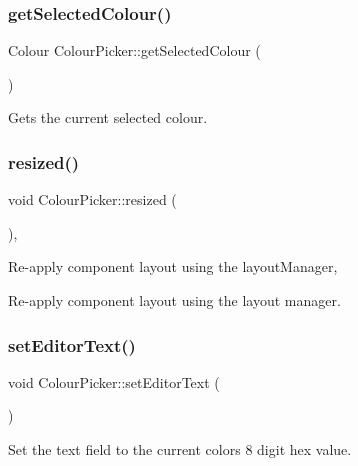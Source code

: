 \subsubsection{\texorpdfstring{get\+Selected\+Colour()}{getSelectedColour()}}
{\footnotesize\ttfamily Colour Colour\+Picker\+::get\+Selected\+Colour (\begin{DoxyParamCaption}{ }\end{DoxyParamCaption})}

Gets the current selected colour. \mbox{\label{classColourPicker_a9572f9b8ec233f5e89d1b6893c9b4300}} 
\subsubsection{\texorpdfstring{resized()}{resized()}}
{\footnotesize\ttfamily void Colour\+Picker\+::resized (\begin{DoxyParamCaption}{ }\end{DoxyParamCaption})\hspace{0.3cm}{\ttfamily [override]}, {\ttfamily [protected]}}

Re-\/apply component layout using the layout\+Manager,

Re-\/apply component layout using the layout manager. \mbox{\label{classColourPicker_a52bf8209281242f85ec63faa3393e624}} 
\subsubsection{\texorpdfstring{set\+Editor\+Text()}{setEditorText()}}
{\footnotesize\ttfamily void Colour\+Picker\+::set\+Editor\+Text (\begin{DoxyParamCaption}{ }\end{DoxyParamCaption})\hspace{0.3cm}{\ttfamily [protected]}}

Set the text field to the current color\textquotesingle{}s 8 digit hex value. \mbox{\label{classColourPicker_a1cbc99e3fe17c0b8679d33bcc7fcf4cf}} 
